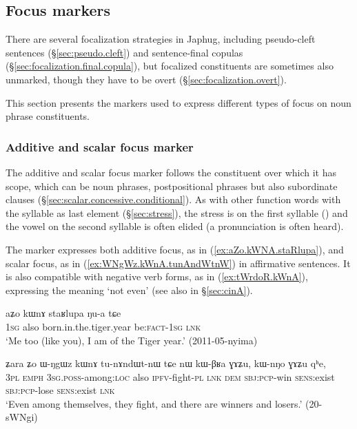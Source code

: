  \subsection{Focus markers} \label{sec:focus}
There are several focalization strategies in Japhug, including pseudo-cleft sentences (§\ref{sec:pseudo.cleft}) and sentence-final copulas (§\ref{sec:focalization.final.copula}), but focalized constituents are sometimes also unmarked, though they have to be overt (§\ref{sec:focalization.overt}).

This section presents the markers used to express different types of focus on noun phrase constituents.


 \subsubsection{Additive and scalar focus marker  } \label{sec:kWnA}
  
The additive and scalar focus marker  follows the constituent over which it has scope, which can be noun phrases, postpositional phrases but also subordinate clauses (§\ref{sec:scalar.concessive.conditional}). As with other function words with the syllable  as last element (§\ref{sec:stress}), the stress is on the first syllable () and the vowel on the second syllable is often elided (a pronunciation  is often heard). 

The marker  expresses both additive focus, as in (\ref{ex:aZo.kWNA.staRlupa}), and scalar focus, as in (\ref{ex:WNgWz.kWnA.tunAndWtnW}) in affirmative sentences. It is also compatible with negative verb forms, as in (\ref{ex:tWrdoR.kWnA}), expressing the meaning `not even' (see also  in §\ref{sec:cinA}).

\begin{exe}
\ex \label{ex:aZo.kWNA.staRlupa}
\gll aʑo kɯnɤ staʁlupa ŋu-a tɕe \\
\textsc{1sg} also born.in.the.tiger.year be:\textsc{fact}-\textsc{1sg} \textsc{lnk} \\
\glt `Me too (like you), I am of the Tiger year.' (2011-05-nyima)
\end{exe}

\begin{exe}
\ex \label{ex:WNgWz.kWnA.tunAndWtnW}
\gll ʑara ʑo ɯ-ŋgɯz kɯnɤ tu-nɤndɯt-nɯ tɕe nɯ kɯ-βʁa ɣɤʑu, kɯ-nŋo ɣɤʑu qʰe, \\
\textsc{3pl} \textsc{emph} \textsc{3sg}.\textsc{poss}-among:\textsc{loc} also \textsc{ipfv}-fight-\textsc{pl} \textsc{lnk} \textsc{dem} \textsc{sbj}:\textsc{pcp}-win \textsc{sens}:exist \textsc{sbj}:\textsc{pcp}-lose  \textsc{sens}:exist \textsc{lnk} \\
\glt `Even among themselves, they fight, and there are winners and losers.' (20-sWNgi)
\end{exe}
 
